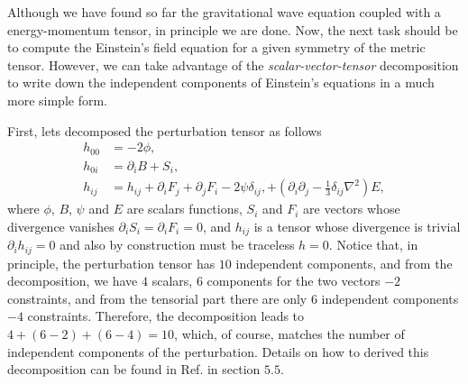 \documentclass{article}
\begin{document}
Although we have found so far the gravitational wave equation coupled with a
energy-momentum tensor, in principle we are done. Now, the next task should be
to compute the Einstein's field equation for a given symmetry of the metric tensor.
However, we can take advantage of the \textit{scalar-vector-tensor} decomposition
to write down the independent components of Einstein's equations in a much more 
simple form.

First, lets decomposed the perturbation tensor as follows
\begin{align}
    h_{00} & = -2\phi, \\
    h_{0i} & = \partial_i B + S_i, \\
    h_{ij} & = h_{ij} + \partial_{i} F_{j} + \partial_{j} F_{i} - 2\psi\delta_{ij}, 
    + \left(\partial_{i}\partial_{j} - \frac{1}{3}\delta_{ij}\nabla^{2}\right)E,
\end{align}
where $\phi$, $B$, $\psi$ and $E$ are scalars functions, $S_i$ and $F_i$ 
are vectors whose divergence vanishes $\partial_{i}S_{i} = \partial_{i}F_{i} = 0$,
and $h_{ij}$ is a tensor whose divergence is trivial $\partial_{i}h_{ij} = 0$ and also
by construction must be traceless $h = 0$. Notice that, in principle, the perturbation
tensor has $10$ independent components, and from the decomposition, we have $4$ scalars,
$6$ components for the two vectors $-2$ constraints, and from the tensorial part
there are only $6$ independent components $-4$ constraints. Therefore, the decomposition
leads to $4 + \left(6 - 2\right) + \left(6 - 4\right) = 10$, which, of course, matches
the number of independent components of the perturbation. Details on how to derived this
decomposition can be found in Ref.\cite{poisson2014gravity} in section $5.5$.
\end{document}
